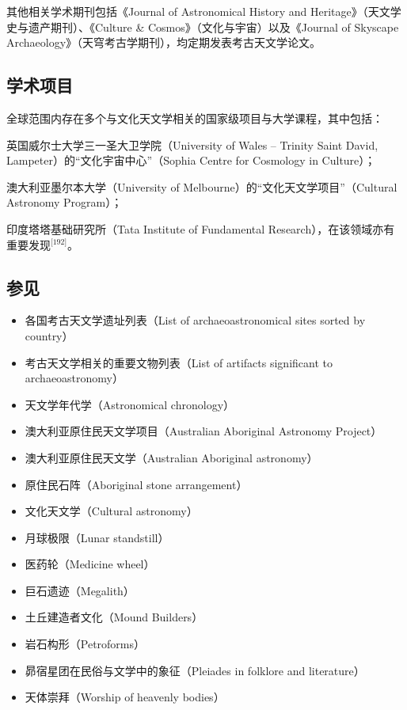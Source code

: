 其他相关学术期刊包括《Journal of Astronomical History and Heritage》（天文学史与遗产期刊）、《Culture \& Cosmos》（文化与宇宙）以及《Journal of Skyscape Archaeology》（天穹考古学期刊），均定期发表考古天文学论文。
\subsection{学术项目}
全球范围内存在多个与文化天文学相关的国家级项目与大学课程，其中包括：

英国威尔士大学三一圣大卫学院（University of Wales – Trinity Saint David, Lampeter）的“文化宇宙中心”（Sophia Centre for Cosmology in Culture）；

澳大利亚墨尔本大学（University of Melbourne）的“文化天文学项目”（Cultural Astronomy Program）；

印度塔塔基础研究所（Tata Institute of Fundamental Research），在该领域亦有重要发现\(^\text{[192]}\)。
\subsection{参见}
\begin{itemize}
    \item 各国考古天文学遗址列表（List of archaeoastronomical sites sorted by country）
    \item 考古天文学相关的重要文物列表（List of artifacts significant to archaeoastronomy）
    \item 天文学年代学（Astronomical chronology）
    \item 澳大利亚原住民天文学项目（Australian Aboriginal Astronomy Project）
    \item 澳大利亚原住民天文学（Australian Aboriginal astronomy）
    \item 原住民石阵（Aboriginal stone arrangement）
    \item 文化天文学（Cultural astronomy）
    \item 月球极限（Lunar standstill）
    \item 医药轮（Medicine wheel）
    \item 巨石遗迹（Megalith）
    \item 土丘建造者文化（Mound Builders）
    \item 岩石构形（Petroforms）
    \item 昴宿星团在民俗与文学中的象征（Pleiades in folklore and literature）
    \item 天体崇拜（Worship of heavenly bodies）
\end{itemize}

